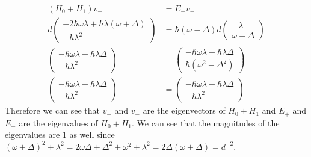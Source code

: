 \documentclass[11pt]{article}
\begin{document}
\begin{align*}
    (H_0+H_1)v_{-} &= E_{-}v_{-}\\
    d \begin{pmatrix}
        -2\hbar\omega\lambda + \hbar\lambda(\omega+\Delta)\\
        -\hbar\lambda^2
    \end{pmatrix} &= \hbar(\omega-\Delta)d\begin{pmatrix}
        -\lambda\\
        \omega+\Delta
    \end{pmatrix}\\
    \begin{pmatrix}
        -\hbar\omega\lambda + \hbar\lambda\Delta\\
        -\hbar\lambda^2
    \end{pmatrix} &= \begin{pmatrix}
        -\hbar\omega\lambda + \hbar\lambda\Delta\\
        \hbar(\omega^2-\Delta^2)
    \end{pmatrix}\\
    \begin{pmatrix}
        -\hbar\omega\lambda + \hbar\lambda\Delta\\
        -\hbar\lambda^2
    \end{pmatrix} &=
    \begin{pmatrix}
        -\hbar\omega\lambda + \hbar\lambda\Delta\\
        -\hbar\lambda^2
    \end{pmatrix}
\end{align*}
Therefore we can see that $v_{+}$ and $v_{-}$ are the 
eigenvectors of $H_0+H_1$ and $E_{+}$ and $E_{-}$ are the
eigenvalues of $H_0+H_1$.
We can see that the magnitudes of the eigenvalues are
$1$ as well since $(\omega+\Delta)^2+\lambda^2=2\omega\Delta+\Delta^2+\omega^2+\lambda^2=2\Delta(\omega+\Delta)=d^{-2}$.
\end{document}
